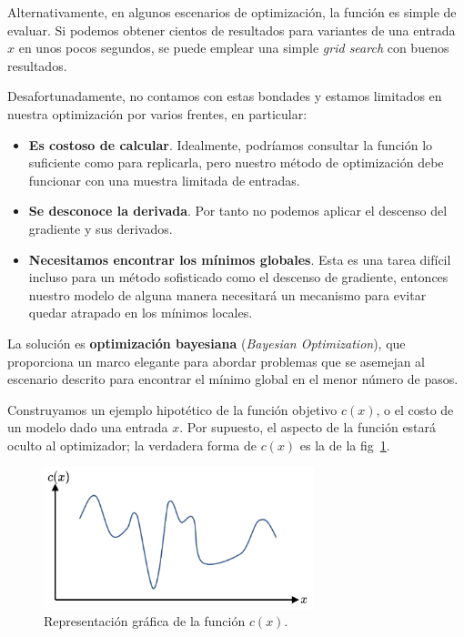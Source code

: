 \documentclass[a4paper,12pt]{article}
\begin{document}
Alternativamente, en algunos escenarios de optimización, la función es simple de evaluar. Si podemos obtener cientos de resultados para variantes de una entrada $x$ en unos pocos segundos, se puede emplear una simple \textit{grid search} con buenos resultados.

Desafortunadamente, no contamos con estas bondades y estamos limitados en nuestra optimización por varios frentes, en particular:
\begin{itemize}[noitemsep, topsep=2pt]
	\item \textbf{Es costoso de calcular}. Idealmente, podríamos consultar la función lo suficiente como para replicarla, pero nuestro método de optimización debe funcionar con una muestra limitada de entradas.
	\item \textbf{Se desconoce la derivada}. Por tanto no podemos aplicar el descenso del gradiente y sus derivados.
	\item \textbf{Necesitamos encontrar los mínimos globales}. Esta es una tarea difícil incluso para un método sofisticado como el descenso de gradiente, entonces nuestro modelo de alguna manera necesitará un mecanismo para evitar quedar atrapado en los mínimos locales.
\end{itemize}

La solución es \textbf{optimización bayesiana} (\textit{Bayesian Optimization}), que proporciona un marco elegante para abordar problemas que se asemejan al escenario descrito para encontrar el mínimo global en el menor número de pasos.

Construyamos un ejemplo hipotético de la función objetivo $c(x)$, o el costo de un modelo dado una entrada $x$. Por supuesto, el aspecto de la función estará oculto al optimizador; la verdadera forma de $c(x)$ es la de la fig~\ref{fig:cx}.

\begin{figure}[H]
	\begin{center}
		\includegraphics[width=0.7\textwidth]{bayes_opt_1_v2.png}
		\caption{Representación gráfica de la función $c(x)$.}
		\label{fig:cx}
	\end{center}
\end{figure}
\end{document}
